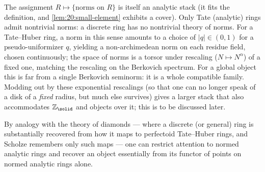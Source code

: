 \begin{remark}
\label{rmk:20:berkovich-relation}
The assignment $R\mapsto\{\text{norms on }R\}$ is itself an analytic stack (it
fits the definition, and \cref{lem:20:small-element} exhibits a cover). Only
Tate (analytic) rings admit nontrivial norms: a discrete ring has no nontrivial
theory of norms. For a Tate--Huber ring, a norm in this sense amounts to a
choice of $|q|\in(0,1)$ for a pseudo-uniformizer $q$, yielding a
non-archimedean norm on each residue field, chosen continuously; the space of
norms is a torsor under rescaling ($N\mapsto N^\alpha$) of a fixed one, matching
the rescaling on the Berkovich spectrum. For a global object this is far from a
single Berkovich seminorm: it is a whole compatible family. Modding out by these
exponential rescalings (so that one can no longer speak of a disk of a
\emph{fixed} radius, but much else survives) gives a larger stack that also
accommodates $\mathbb Z_\solid$ and objects over it; this is to be discussed
later.
\end{remark}

\begin{remark}
\label{rmk:20:reconstruction}
By analogy with the theory of diamonds --- where a discrete (or general) ring is
substantially recovered from how it maps to perfectoid Tate--Huber rings, and
Scholze remembers only such maps --- one can restrict attention to normed
analytic rings and recover an object essentially from its functor of points on
normed analytic rings alone.
\end{remark}
